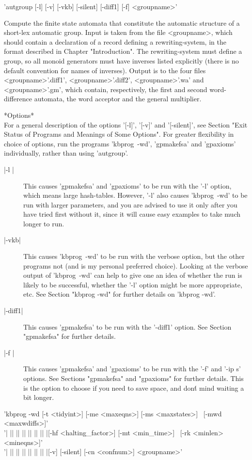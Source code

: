 'autgroup  [-l] [-v] [-vkb] [-silent] [-diff1] [-f] <groupname>'

Compute the finite state automata that constitute the automatic structure
of a short-lex automatic group. Input is taken from the file <groupname>,
which should contain a declaration of a record defining a rewriting-system, in
the format described in Chapter "Introduction". The rewriting-system must
define a group, so all monoid generators must have inverses listed explicitly
(there is no default convention for names of inverses). Output is to the
four files <groupname>'.diff1', <groupname>'.diff2', <groupname>'.wa' and
<groupname>'.gm', which contain, respectively, the first and second
word-difference automata, the word acceptor and the general multiplier.

*Options*\\
For a general description of the options '[-l]', '[-v]' and '[-silent]',
see Section
"Exit Status of Programs and Meanings of Some Options".
For greater flexibility in choice of options, run the programs 'kbprog\ -wd',
'gpmakefsa' and 'gpaxioms' individually, rather than using 'autgroup'. 

\begin{description}
\item[|-l |]
This causes 'gpmakefsa' and 'gpaxioms' to be run with the '-l' option, which
means large hash-tables. However, '-l' also causes 'kbprog\ -wd' to be run
with larger parameters, and you are advised to use it only after you
have tried first without it, since it will cause easy examples to take
much longer to run.
\item[|-vkb|]
This causes 'kbprog\ -wd' to be run with the verbose option, but the other
programs not (and is my personal preferred choice). Looking at the
verbose output of 'kbprog\ -wd' can help to give one an idea of whether the run
is likely to be successful, whether the '-l' option might be
more appropriate, etc. See Section "kbprog -wd" for further details on
'kbprog -wd'.
\item[|-diff1|]
This causes 'gpmakefsa' to be run with the '-diff1' option. See Section
"gpmakefsa" for further details.
\item[|-f |] This causes 'gpmakefsa' and 'gpaxioms' to be run with the
'-f' and '-ip s' options. See Sections "gpmakefsa" and "gpaxioms" for
further details. This is the option to choose if you need to save space,
and don\'t mind waiting a bit longer.
\end{description}
'kbprog -wd [-t <tidyint>] [-me <maxeqns>] [-ms <maxstates>] \
[-mwd <maxwdiffs>]'\\
'| || || || || || || |[-hf <halting\_factor>] [-mt <min\_time>] \
[-rk <minlen> <mineqns>]'\\
'| || || || || || || |[-v] [-silent] [-cn <confnum>] <groupname>'

